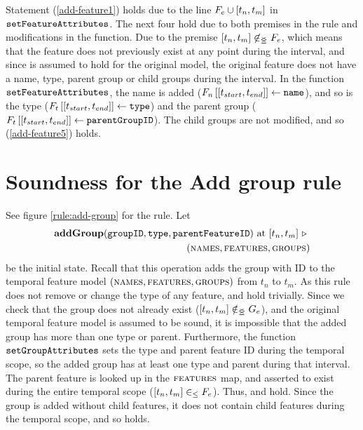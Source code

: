 Statement (\ref{add-feature1}) holds due to the line $F_e \cup \interval{t_n}{t_m}$ in $\texttt{setFeatureAttributes}$. The next four hold due to both premises in the rule and modifications in the function. Due to the premise $\interval{t_n}{t_m} \not \innr F_e$, which means that the feature does not previously exist at any point during the interval, and since  is assumed to hold for the original model, the original feature does not have a name, type, parent group or child groups during the interval. In the function $\texttt{setFeatureAttributes}$, the name is added ($\lookup{F_n}{\interval{t_{start}}{t_{end}}} \assign \var{name}$), and so is the type ($\lookup{F_t}{\interval{t_{start}}{t_{end}}} \assign \var{type}$) and the parent group ($\lookup{F_t}{\interval{t_{start}}{t_{end}}} \assign \var{parentGroupID}$). The child groups are not modified, and so (\ref{add-feature5}) holds.

\section{Soundness for the Add group rule}
\label{sec:soundness-for-the-add-group-rule}

See figure \vref{rule:add-group} for the  rule. 
Let 
\begin{equation*}
   \begin{split}
      \textbf{addGroup}(\var{groupID}, \var{type}, \var{parentFeatureID})\text{ at }\interval{t_n}{t_m}
      \shove \\
   (\names{}, \features{}, \groups{})
\end{split}
\end{equation*}
be the initial state. Recall that this operation adds the group with ID  to the temporal feature model $(\textsc{names}{}, \textsc{features}{}, \textsc{groups}{}{})$ from $t_n$ to $t_m$. As this rule does not remove or change the type of any feature,  and  hold trivially. Since we check that the group does not already exist ($\interval{t_n}{t_m} \notinnr G_e$), and the original temporal feature model is assumed to be sound, it is impossible that the added group has more than one type or parent. Furthermore, the function $\texttt{setGroupAttributes}$ sets the type and parent feature ID during the temporal scope, so the added group has at least one type and parent during that interval. The parent feature is looked up in the $\textsc{features}{}$ map, and asserted to exist during the entire temporal scope ($\interval{t_n}{t_m} \inn F_e$). Thus,  and  hold. Since the group is added without child features, it does not contain child features during the temporal scope, and so  holds.

